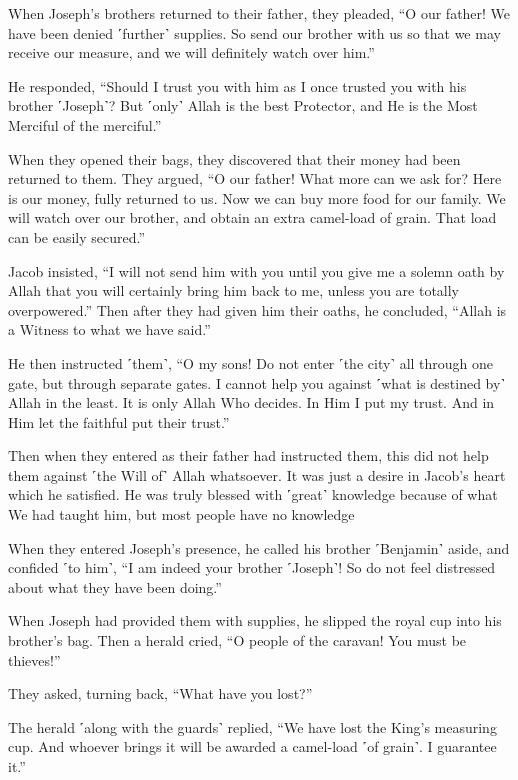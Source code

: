 When Joseph’s brothers returned to their father, they pleaded, “O our father! We have been denied ˹further˺ supplies. So send our brother with us so that we may receive our measure, and we will definitely watch over him.”

He responded, “Should I trust you with him as I once trusted you with his brother ˹Joseph˺? But ˹only˺ Allah is the best Protector, and He is the Most Merciful of the merciful.”

When they opened their bags, they discovered that their money had been returned to them. They argued, “O our father! What more can we ask for? Here is our money, fully returned to us. Now we can buy more food for our family. We will watch over our brother, and obtain an extra camel-load of grain. That load can be easily secured.”

Jacob insisted, “I will not send him with you until you give me a solemn oath by Allah that you will certainly bring him back to me, unless you are totally overpowered.” Then after they had given him their oaths, he concluded, “Allah is a Witness to what we have said.”

He then instructed ˹them˺, “O my sons! Do not enter ˹the city˺ all through one gate, but through separate gates. I cannot help you against ˹what is destined by˺ Allah in the least. It is only Allah Who decides. In Him I put my trust. And in Him let the faithful put their trust.”

Then when they entered as their father had instructed them, this did not help them against ˹the Will of˺ Allah whatsoever. It was just a desire in Jacob’s heart which he satisfied. He was truly blessed with ˹great˺ knowledge because of what We had taught him, but most people have no knowledge

When they entered Joseph’s presence, he called his brother ˹Benjamin˺ aside, and confided ˹to him˺, “I am indeed your brother ˹Joseph˺! So do not feel distressed about what they have been doing.”

When Joseph had provided them with supplies, he slipped the royal cup into his brother’s bag. Then a herald cried, “O people of the caravan! You must be thieves!”

They asked, turning back, “What have you lost?”

The herald ˹along with the guards˺ replied, “We have lost the King’s measuring cup. And whoever brings it will be awarded a camel-load ˹of grain˺. I guarantee it.”

